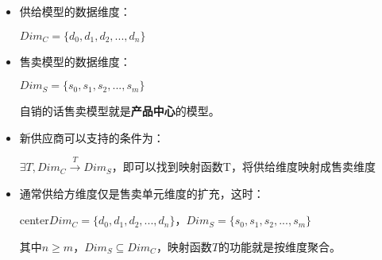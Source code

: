 \documentclass[a4paper]{article}
\begin{document}
\begin{itemize}
    \item 供给模型的数据维度：
    \begin{center}
        $Dim_C=\{d_0,d_1,d_2,...,d_n\}$
    \end{center}
    \item 售卖模型的数据维度：
    \begin{center}
        $Dim_S=\{s_0,s_1,s_2,...,s_m\}$
    \end{center}
    自销的话售卖模型就是\textbf{产品中心}的模型。
    \item 新供应商可以支持的条件为：
    \begin{center}
        $\exists T, Dim_C  \stackrel{T}{\longrightarrow} Dim_S$，即可以找到映射函数T，将供给维度映射成售卖维度
    \end{center}
    \item 通常供给方维度仅是售卖单元维度的扩充，这时：
        \begin{center}
            {center}$Dim_C=\{d_0,d_1,d_2,...,d_n\}$，$Dim_S=\{s_0,s_1,s_2,...,s_m\}$
        \end{center}
        其中$n \ge m，Dim_S  \subseteq Dim_C$，映射函数$T$的功能就是按维度聚合。
\end{itemize}
\end{document}
